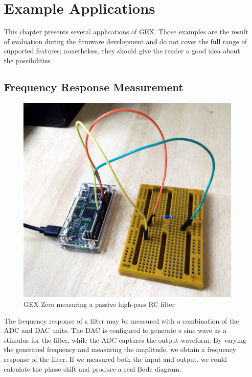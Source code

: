 \chapter{Example Applications}

This chapter presents several applications of GEX. Those examples are the result of evaluation during the firmware development and do not cover the full range of supported features; nonetheless, they should give the reader a good idea about the possibilities.

\section{Frequency Response Measurement}

\begin{figure}
	\vspace{-1em}
	\centering
	\includegraphics[width=\linewidth]{img/demofilter.jpg}
		\caption{GEX Zero measuring a passive high-pass RC filter}
		\label{fig:demofilter}
\end{figure}

The frequency response of a filter may be measured with a combination of the \gls{ADC} and \gls{DAC} units. The \gls{DAC} is configured to generate a sine wave as a stimulus for the filter, while the \gls{ADC} captures the output waveform. By varying the generated frequency and measuring the amplitude, we obtain a frequency response of the filter. If we measured both the input and output, we could calculate the phase shift and produce a real Bode diagram.

